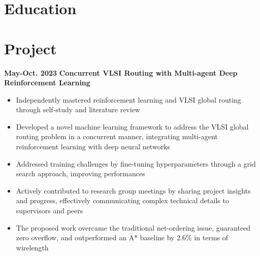 \documentclass[11pt,a4paper,sans]{moderncv}
\begin{document}
\makecvtitle

\section{Education}

\section{Project}

\cventry
{\textnormal{\textbf{May-Oct. 2023}}}
{\textnormal{\textbf{Concurrent VLSI Routing with Multi-agent
Deep Reinforcement Learning}}}
{}{}{}
{
    \begin{itemize}
        \item Independently mastered reinforcement learning and VLSI global routing through  self-study and literature review
        \item Developed a novel machine learning framework to address the VLSI global routing problem in a concurrent manner, integrating multi-agent reinforcement learning with deep neural networks
        \item Addressed training challenges by fine-tuning hyperparameters through a grid search approach, improving performances
        \item Actively contributed to research group meetings by sharing project insights and progress, effectively communicating complex technical details to supervisors and peers
        \item The proposed work overcame the traditional net-ordering issue, guaranteed zero overflow, and outperformed an A* baseline by 2.6\% in terms of wirelength
        \end{itemize}
}
\end{document}
